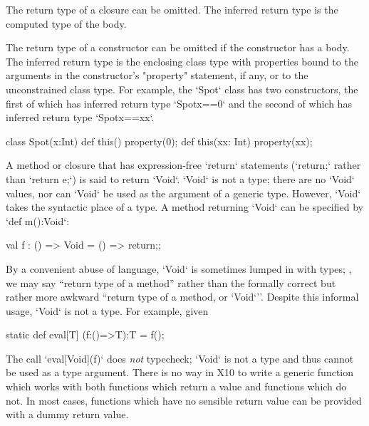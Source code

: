 {{The return type of a closure can be omitted.
The inferred return type is the computed type of the body.

The return type of a constructor can be omitted if the
constructor has a body.
The inferred return type is the enclosing class type with
properties bound to the arguments in the constructor's \xcd"property"
statement, if any, or to the unconstrained class type.
For example, the \xcd`Spot` class has two constructors, the first of which has
inferred return type \xcd`Spot{x==0}` and the second of which has 
inferred return type \xcd`Spot{x==xx}`. 
\begin{xten}
class Spot(x:Int) {
  def this() {property(0);}
  def this(xx: Int) { property(xx); }
}
\end{xten}



A method or closure that has expression-free \xcd`return` statements
(\xcd`return;` rather than \xcd`return e;`) is said to return \xcd`Void`.
\xcd`Void` is not a type; there are no \xcd`Void` values, nor can \xcd`Void`
be used as the argument of a generic type. However, \xcd`Void` takes the
syntactic place of a type. A method returning \xcd`Void` can be specified by
\xcd`def m():Void`: 

\begin{xten}
val f : () => Void = () => {return;};
\end{xten}

By a convenient abuse of language, \xcd`Void` is sometimes
lumped in with types; \eg, we may say ``return type of a method'' rather than
the formally correct but rather more awkward ``return type of a method, or
\xcd`Void`''.   Despite this informal usage, \xcd`Void` is not a type.  For
example, given 
\begin{xten}
  static def eval[T] (f:()=>T):T = f();
\end{xten}
\noindent
The call \xcd`eval[Void](f)` does {\em not} typecheck; \xcd`Void` is not a
type and thus cannot be used as a type argument.  There is no way in X10 to
write a generic function which works with both functions which return a value
and functions which do not.  In most cases, functions which have no sensible
return value can be provided with a dummy return value.

}}
